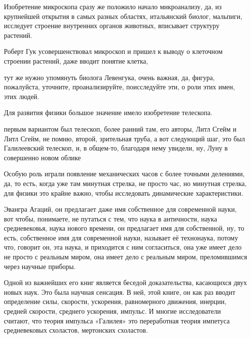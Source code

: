 Изобретение микроскопа сразу
же положило начало микроанализу, да, из крупнейшей открытия в самых разных
областях, итальянский биолог, мальпиги, исследует строение внутренних органов
животных, вписывает структуру растений. 

Роберт Гук усовершенствовал микроскоп и пришел к
выводу о клеточном строении растений, даже вводит понятие клетка, 

тут же нужно
упомянуть биолога Левенгука, очень важная, да, фигура, пожалуйста, уточните,
проанализируйте, поисследуйте эти, о роли этих имен, этих людей.

Для развития
физики большое значение имело изобретение телескопа.

первым
вариантом был телескоп, более ранний там, его авторы, Литл Сгейм и Литл Сгейм,
не помню, второй, зрительная труба, а вот следующий шаг, это был Галилеевский  телескоп, и, в общем-то, благодаря нему увидели, ну, Луну в
совершенно новом облике

Особую роль играли появление механических часов с более
точными делениями, да, то есть, когда уже там минутная стрелка, не просто час,
но минутная стрелка, для физики это крайне важно, чтобы исследовать динамические
характеристики. 

Эвангра Агаций, он
предлагает даже имя собственное для современной науки, вот чтобы, понимаете, не
путаться с тем, что наука в античности, наука средневековья, наука нового
времени, он предлагает имя для собственной, ну, то есть, собственное имя для
современной науки, называет её технонаука, потому что, говорит он, эта наука, и
приходится с ним согласиться, она уже имеет дело не просто с реальным миром, она
имеет дело с реальным миром, преломившимся через научные приборы.

Одной из важнейших его книг является беседой
доказательства, касающихся двух новых наук. Это была научная сенсация. В ней,
этой книге, он как раз вводит определение силы, скорости, ускорения,
равномерного движения, инерции, средней скорости, среднего ускорения, импульс. И
многие исследователи считают, что теория импульса «Галилея» это переработная
теория импетуса средневековых схоластов, мертонских схоластов. 


